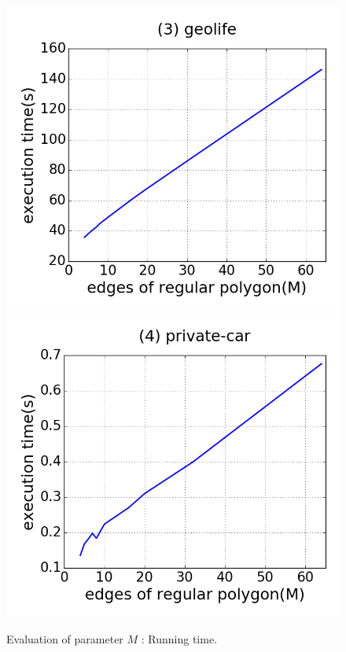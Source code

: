 \begin{figure}[tb!]
\includegraphics[scale = 0.25]{figures/Exp-M-time-geolife.png}
\includegraphics[scale = 0.25]{figures/Exp-M-time-private.png}
\vspace{-3ex}
\caption{\small Evaluation of parameter $M$ : Running time.}
\label{fig:m-time}
\vspace{-1ex}
\end{figure}




